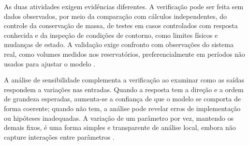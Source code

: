 As duas atividades exigem evidências diferentes. A verificação pode ser feita sem dados observados, por meio da comparação com cálculos independentes, do controle da conservação de massa, de testes em casos controlados com resposta conhecida e da inspeção de condições de contorno, como limites físicos e mudanças de estado. A validação exige confronto com observações do sistema real, como volumes medidos nos reservatórios, preferencialmente em períodos não usados para ajustar o modelo \cite{refsgaardHenriksen2004}.

A análise de sensibilidade complementa a verificação ao examinar como as saídas respondem a variações nas entradas. Quando a resposta tem a direção e a ordem de grandeza esperadas, aumenta-se a confiança de que o modelo se comporta de forma coerente; quando não tem, a análise pode revelar erros de implementação ou hipóteses inadequadas. A variação de um parâmetro por vez, mantendo os demais fixos, é uma forma simples e transparente de análise local, embora não capture interações entre parâmetros \cite{pianosi2016}.
